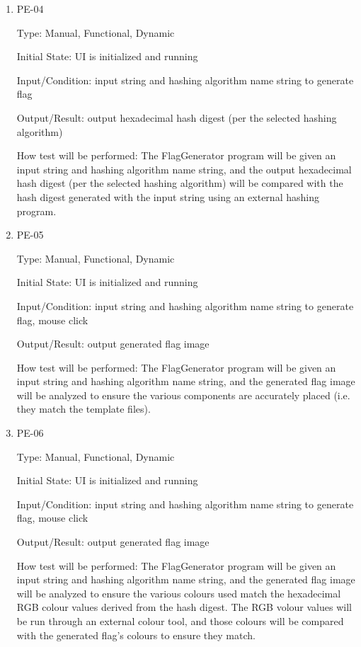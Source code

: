 \documentclass[12pt, titlepage]{article}
\begin{document}
\begin{enumerate}

\item{PE-04\\}

Type: Manual, Functional, Dynamic

Initial State: UI is initialized and running

Input/Condition: input string and hashing algorithm name string to generate
flag

Output/Result: output hexadecimal hash digest (per the selected hashing
algorithm)

How test will be performed: The FlagGenerator program will be given an input
string and hashing algorithm name string, and the output hexadecimal hash
digest (per the selected hashing algorithm) will be compared with the hash
digest generated with the input string using an external hashing program.

\item{PE-05\\}

Type: Manual, Functional, Dynamic

Initial State: UI is initialized and running

Input/Condition: input string and hashing algorithm name string to generate
flag, mouse click

Output/Result: output generated flag image

How test will be performed: The FlagGenerator program will be given an input
string and hashing algorithm name string, and the generated flag image will
be analyzed to ensure the various components are accurately placed (i.e. they
match the template files).

\item{PE-06\\}

Type: Manual, Functional, Dynamic

Initial State: UI is initialized and running

Input/Condition: input string and hashing algorithm name string to generate
flag, mouse click

Output/Result: output generated flag image

How test will be performed: The FlagGenerator program will be given an input
string and hashing algorithm name string, and the generated flag image will
be analyzed to ensure the various colours used match the hexadecimal RGB
colour values derived from the hash digest. The RGB volour values will be run
through an external colour tool, and those colours will be compared with the
generated flag's colours to ensure they match.

\end{enumerate}
\end{document}
